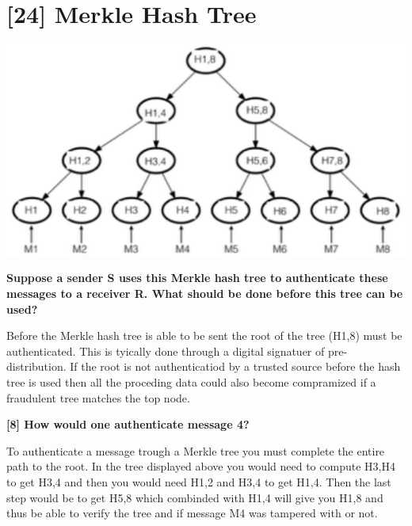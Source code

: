 \documentclass[letterpaper,11pt,notitlepage,fleqn]{article}
\begin{document}
\section{[24] Merkle Hash Tree}
\begin{center}
    \includegraphics[scale=0.5]{tree.eps}
\end{center}

\noindent \textbf{Suppose a sender S uses this Merkle hash tree to authenticate these messages to a receiver R. What should be done before this tree can be used?}

Before the Merkle hash tree is able to be sent the root of the tree (H1,8) must be authenticated. This is tyically done through a digital signatuer of pre-distribution. If the root is not authenticatiod by a trusted source before the hash tree is used then all the proceding data could also become compramized if a fraudulent tree matches the top node. 

\noindent \textbf{[8] How would one authenticate message 4?}

To authenticate a message trough a Merkle tree you must complete the entire path to the root. In the tree displayed above you would need to compute H3,H4 to get H3,4 and then you would need H1,2 and H3,4 to get H1,4. Then the last step would be to get H5,8 which combinded with H1,4 will give you H1,8 and thus be able to verify the tree and if message M4 was tampered with or not.
\end{document}
